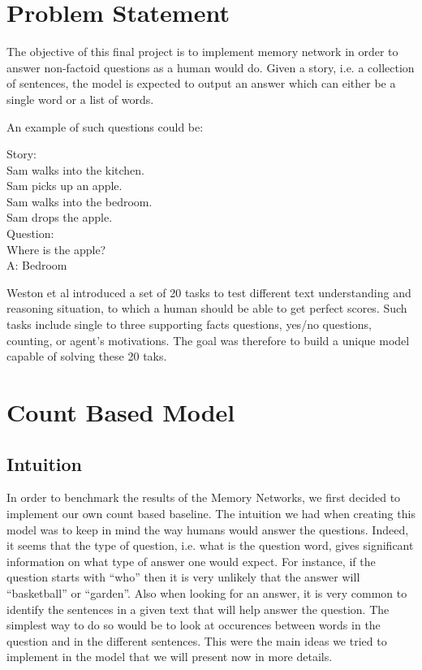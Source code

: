 \documentclass[twoside,11pt]{article}
\begin{document}
\section{Problem Statement}

The objective of this final project is to implement memory network in order to answer non-factoid questions as a human would do. Given a story, i.e. a collection of sentences, the model is expected to output an answer which can either be a single word or a list of words.\newpage

\noindent An example of such questions could be:

\begin{framed}
\begin{center}
Story: \\
Sam walks into the kitchen.\\
Sam picks up an apple.\\
Sam walks into the bedroom.\\
Sam drops the apple.\\
Question:\\
Where is the apple?\\
A: Bedroom
\end{center}
\end{framed}

\noindent Weston et al introduced a set of 20 tasks to test different text understanding and reasoning situation, to which a human should be able to get perfect scores. Such tasks include  single to three supporting facts questions, yes/no questions, counting, or agent's motivations. The goal was therefore to build a unique model capable of solving these 20 taks.

\section{Count Based Model}
\subsection{Intuition}
In order to benchmark the results of the Memory Networks, we first decided to implement our own count based baseline. The intuition we had when creating this model was to keep in mind the way humans would answer the questions. Indeed, it seems that the type of question, i.e. what is the question word, gives significant information on what type of answer one would expect. For instance, if the question starts with ``who'' then it is very unlikely that the answer will ``basketball'' or ``garden''. Also when looking for an answer, it is very common to identify the sentences in a given text that will help answer the question. The simplest way to do so would be to look at occurences between words in the question and in the different sentences. This were the main ideas we tried to implement in the model that we will present now in more details.
\end{document}

